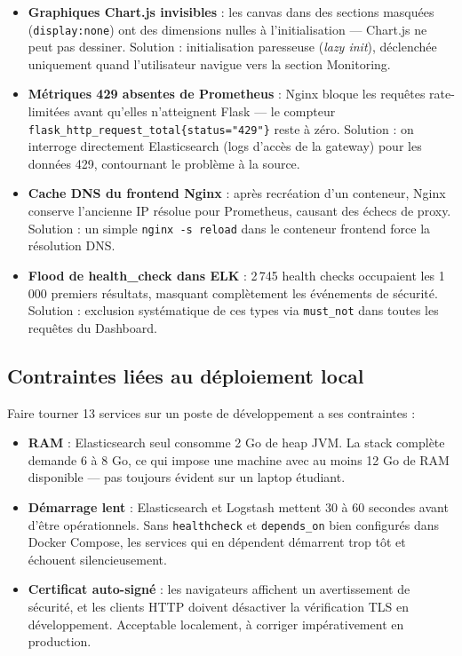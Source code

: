 \documentclass[12pt, a4paper]{report}
\begin{document}
\begin{itemize}[leftmargin=*]
  \item \textbf{Graphiques Chart.js invisibles} : les canvas dans des sections masquées (\texttt{display:none}) ont des dimensions nulles à l'initialisation — Chart.js ne peut pas dessiner. Solution : initialisation paresseuse (\textit{lazy init}), déclenchée uniquement quand l'utilisateur navigue vers la section Monitoring.
  \item \textbf{Métriques 429 absentes de Prometheus} : Nginx bloque les requêtes rate-limitées avant qu'elles n'atteignent Flask — le compteur \texttt{flask\_http\_request\_total\{status="429"\}} reste à zéro. Solution : on interroge directement Elasticsearch (logs d'accès de la gateway) pour les données 429, contournant le problème à la source.
  \item \textbf{Cache DNS du frontend Nginx} : après recréation d'un conteneur, Nginx conserve l'ancienne IP résolue pour Prometheus, causant des échecs de proxy. Solution : un simple \texttt{nginx -s reload} dans le conteneur frontend force la résolution DNS.
  \item \textbf{Flood de health\_check dans ELK} : 2\,745 health checks occupaient les 1\,000 premiers résultats, masquant complètement les événements de sécurité. Solution : exclusion systématique de ces types via \texttt{must\_not} dans toutes les requêtes du Dashboard.
\end{itemize}

\subsection{Contraintes liées au déploiement local}

Faire tourner 13 services sur un poste de développement a ses contraintes :

\begin{itemize}[leftmargin=*]
  \item \textbf{RAM} : Elasticsearch seul consomme 2 Go de heap JVM. La stack complète demande 6 à 8 Go, ce qui impose une machine avec au moins 12 Go de RAM disponible — pas toujours évident sur un laptop étudiant.
  \item \textbf{Démarrage lent} : Elasticsearch et Logstash mettent 30 à 60 secondes avant d'être opérationnels. Sans \texttt{healthcheck} et \texttt{depends\_on} bien configurés dans Docker Compose, les services qui en dépendent démarrent trop tôt et échouent silencieusement.
  \item \textbf{Certificat auto-signé} : les navigateurs affichent un avertissement de sécurité, et les clients HTTP doivent désactiver la vérification TLS en développement. Acceptable localement, à corriger impérativement en production.
\end{itemize}
\end{document}
